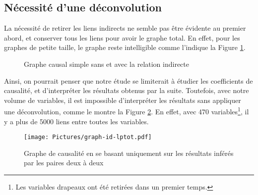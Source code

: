 \documentclass[11pt,fleqn,a4paper,openany,frenchb]{book} %
\begin{document}

\subsection{Nécessité d'une déconvolution}
La nécessité de retirer les liens indirects ne semble pas être évidente au premier abord, et conserver tous les liens pour avoir le graphe total. En effet, pour les graphes de petite taille, le graphe reste intelligible comme l'indique la Figure \ref{fig:graph-in-direct}. \par

\begin{figure}[!h]
  \centering
  \hspace{2pt}
  \caption{Graphe causal simple sans et avec la relation indirecte}
  \label{fig:graph-in-direct}
\end{figure}

Ainsi, on pourrait penser que notre étude se limiterait à étudier les coefficients de causalité, et d'interpréter les résultats obtenus par la suite. Toutefois, avec notre volume de variables, il est impossible d'interpréter les résultats sans appliquer une déconvolution, comme le montre la Figure \ref{fig:graph-ind-lp}. En effet, avec 470 variables\footnote{Les variables drapeaux ont été retirées dans un premier temps.}, il y a plus de 5000 liens entre toutes les variables.

\begin{figure}[!h]
\centering
 \texttt{[image: Pictures/graph-id-lptot.pdf]}
\caption{Graphe de causalité en se basant uniquement sur les résultats inférés par les paires deux à deux}
\label{fig:graph-ind-lp}

\end{figure}
\end{document}
